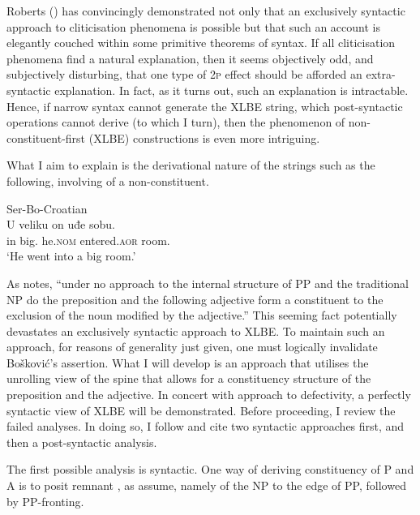 \documentclass[output=paper]{langsci/langscibook}
\begin{document}
Roberts (\citeyear{Roberts2010,roberts:2012uq}) has convincingly demonstrated
not only that an exclusively syntactic approach to cliticisation
phenomena is possible but that such an account is elegantly couched within some
primitive theorems of syntax. If all cliticisation phenomena find a
natural explanation, then it seems objectively odd, and subjectively
disturbing, that one type of \textsc{2p} effect should be afforded an
extra-syntactic explanation. In fact, as it turns out, such an explanation is
intractable.  Hence, if narrow syntax cannot generate the XLBE string, which
post-syntactic operations cannot derive (to which I turn), then the phenomenon
of non-constituent-first (XLBE) constructions is even more intriguing.

What I aim to explain is the derivational nature of the strings such as the
following, involving  of a non-constituent.

\begin{exe}
    \ex Ser-Bo-Croatian\\
    \gll U veliku on uđe sobu.  \\
	in big.\Loc{}  he.\textsc{nom} entered.\textsc{aor} room.\Loc{} \\
	\trans `He went into a big room.' \hfill \citep[30n78]{Boskovic:2005}
\end{exe}

As \citet[30]{Boskovic:2005} notes, ``under no approach to the internal
structure of PP and the traditional NP do the preposition and the following
adjective form a constituent to the exclusion of the noun modified by the
adjective.'' This seeming fact potentially devastates an exclusively syntactic
approach to XLBE\@. To maintain such an approach, for reasons of generality
just given, one must logically invalidate Bošković's assertion. What I will
develop is an approach that utilises the unrolling view of the spine that
allows for a constituency structure of the preposition and the adjective.  In
concert with  approach to defectivity, a perfectly
syntactic view of XLBE will be demonstrated. Before proceeding, I review the
failed analyses. In doing so, I follow \citet[30ff.]{Boskovic:2005} and cite
two syntactic approaches first, and then a post-syntactic analysis.

The first possible analysis is syntactic. One way of deriving
con\-sti\-tu\-en\-cy of P and A is to posit remnant , as
\citet{FranksProgovac:1994} assume, namely  of the NP to the edge
of PP, followed by PP-fronting.
\end{document}
